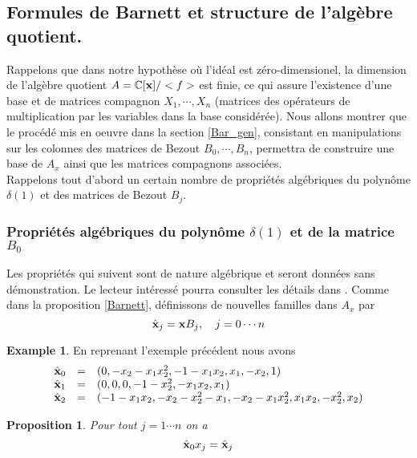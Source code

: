 \documentclass{article}
\theoremstyle{plain}%
\newtheorem{prop}{Proposition}
\theoremstyle{definition}
\newtheorem{exmp}{Example}
\theoremstyle{remark}
\newcommand{\C}{\mathbb{C}}
\begin{document}
\subsection{Formules de Barnett et structure de l'algèbre quotient.}

Rappelons que dans notre hypothèse où l'idéal est zéro-dimensionel, la dimension de l'algèbre quotient $A = \C[\bold{x}]/<f>$ est finie, ce qui assure l'existence d'une base et de matrices compagnon $X_1,\cdots, X_n$ (matrices des opérateurs de multiplication par les variables dans la base considérée). Nous allons montrer que le procédé mis en oeuvre dans la section \ref{Bar_gen}, consistant en manipulations sur les colonnes des matrices de Bezout $B_0, \cdots, B_n $, permettra de construire une base de $A_x$ ainsi que les matrices compagnons associées.\\
Rappelons tout d'abord un certain nombre de propriétés algébriques du polynôme $\delta(1)$ et des matrices de Bezout $B_j$.

\subsubsection{Propriétés algébriques du polynôme $\delta(1)$ et de la matrice $B_0$}
Les propriétés qui suivent sont de nature algébrique et seront données sans démonstration. Le lecteur intéressé pourra consulter les détails dans \cite{jpc, CM}. Comme dans la proposition \ref{Barnett}, définissons de nouvelles familles dans $A_x$ par 
\begin{equation}
		\hat{\bold{x}}_j  =  \bold{x}B_j, \quad j=0\cdots n
\end{equation}

\begin{exmp}
En reprenant l'exemple précédent nous avons 
\begin{equation}
	\begin{array}{lll}
		\hat{\bold{x}}_0 & = & (0, -x_2 - x_1x_2^2, -1 - x_1x_2, x_1, -x_2, 1) \\
		\hat{\bold{x}}_1 & = & (0, 0, 0, -1 - x_2^2, -x_1x_2, x_1) \\
		\hat{\bold{x}}_2 & = & (-1 - x_1x_2, -x_2 - x_2^2 - x_1, - x_2 - x_1x_2^2, x_1x_2, -x_2^2, x_2)
	\end{array}
\end{equation}
\end{exmp}

\begin{prop}
\label{xj}
Pour tout $j=1\cdots n$ on a 
\begin{equation}
    \hat{\bold{x}}_0x_j = \hat{\bold{x}}_j
\end{equation}
\end{prop}
\end{document}
